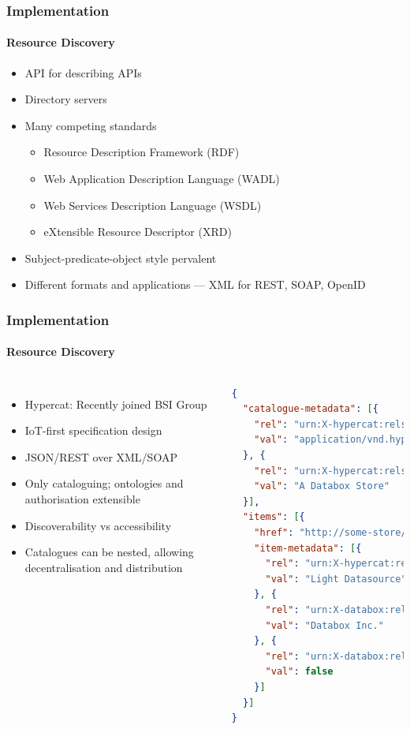 \documentclass[aspectratio=169]{beamer}
\begin{document}
\begin{frame}
	\frametitle{Implementation}
	\framesubtitle{Resource Discovery}
	\begin{itemize}
		\item API for describing APIs
		\item Directory servers
		\item Many competing standards
		\begin{itemize}
			\item Resource Description Framework (RDF)
			\item Web Application Description Language (WADL)
			\item Web Services Description Language (WSDL)
			\item eXtensible Resource Descriptor (XRD)
		\end{itemize}
		\item Subject-predicate-object style pervalent
		\item Different formats and applications --- XML for REST, SOAP, OpenID
	\end{itemize}
\end{frame}

\begin{frame}[fragile]
	\frametitle{Implementation}
	\framesubtitle{Resource Discovery}
	\begin{columns}[c]
		\begin{itemize}
			\item Hypercat: Recently joined BSI Group
			\item IoT-first specification design
			\item JSON/REST over XML/SOAP
			\item Only cataloguing; ontologies and authorisation extensible
			\item Discoverability vs accessibility
			\item Catalogues can be nested, allowing decentralisation and distribution
		\end{itemize}
		\begin{lstlisting}[language=json,basicstyle=\tiny\ttfamily]
{
  "catalogue-metadata": [{
    "rel": "urn:X-hypercat:rels:isContentType",
    "val": "application/vnd.hypercat.catalogue+json"
  }, {
    "rel": "urn:X-hypercat:rels:hasDescription:en",
    "val": "A Databox Store"
  }],
  "items": [{
    "href": "http://some-store/light",
    "item-metadata": [{
      "rel": "urn:X-hypercat:rels:hasDescription:en",
      "val": "Light Datasource"
    }, {
      "rel": "urn:X-databox:rels:hasVendor",
      "val": "Databox Inc."
    }, {
      "rel": "urn:X-databox:rels:isActuator",
      "val": false
    }]
  }]
}
		\end{lstlisting}
	\end{columns}
\end{frame}
\end{document}
